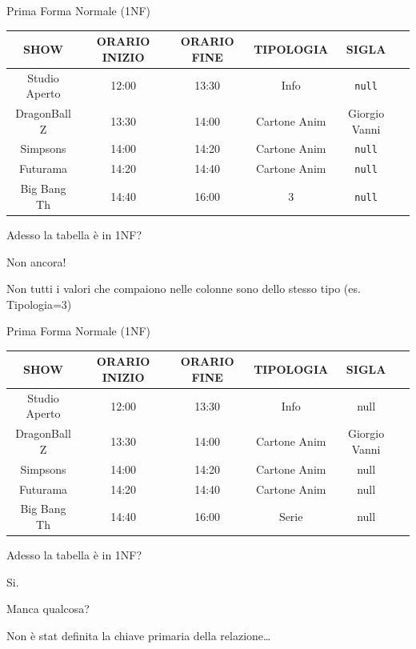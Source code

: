 %
\begin{frame}{Prima Forma Normale (1NF)}
\begin{table}[h]
    \centering
    \begin{tabular}{|c|c|c|c|c|c|}
        \hline
        \rowcolor{cyan!30} \textbf{SHOW} & \textbf{ORARIO INIZIO} & \textbf{ORARIO FINE} & \textbf{TIPOLOGIA} & \textbf{SIGLA} \\ \hline
        Studio Aperto & 12:00 & 13:30 & Info & \texttt{null} \\ \hline
        DragonBall Z & 13:30 & 14:00 & Cartone Anim & Giorgio Vanni \\ \hline
        Simpsons & 14:00 & 14:20 & Cartone Anim & \texttt{null} \\ \hline
        Futurama & 14:20 & 14:40 & Cartone Anim & \texttt{null} \\ \hline
        Big Bang Th & 14:40 & 16:00 & 3 & \texttt{null} \\ \hline
    \end{tabular}
\end{table}
Adesso la tabella \`e in 1NF?
\pause

Non ancora!

Non tutti i valori che compaiono nelle colonne sono dello stesso tipo (es. Tipologia=3)
\end{frame}
%
\begin{frame}{Prima Forma Normale (1NF)}
\begin{table}[h]
    \centering
    \begin{tabular}{|c|c|c|c|c|c|}
        \hline
        \rowcolor{cyan!30} \textbf{SHOW} & \textbf{ORARIO INIZIO} & \textbf{ORARIO FINE} & \textbf{TIPOLOGIA} & \textbf{SIGLA} \\ \hline
        Studio Aperto & 12:00 & 13:30 & Info & null \\ \hline
        DragonBall Z & 13:30 & 14:00 & Cartone Anim & Giorgio Vanni \\ \hline
        Simpsons & 14:00 & 14:20 & Cartone Anim & null \\ \hline
        Futurama & 14:20 & 14:40 & Cartone Anim & null \\ \hline
        Big Bang Th & 14:40 & 16:00 & Serie & null \\ \hline
    \end{tabular}
\end{table}
Adesso la tabella \`e in 1NF?
\pause

Si.
\pause

Manca qualcosa?

\pause
Non \`e stat definita la chiave primaria della relazione\ldots
\end{frame}
